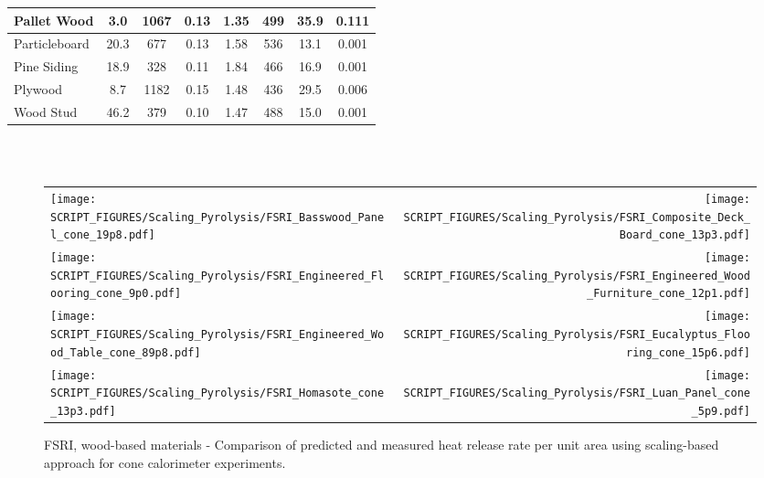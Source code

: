 \begin{table}[!h]
\begin{tabular}{|p{4.5cm}|c|c|c|c|c|c|c|}
Pallet Wood                                       & 3.0  & 1067 & 0.13 & 1.35 & 499 & 35.9 & 0.111 \\\hline
Particleboard                                     & 20.3 & 677  & 0.13 & 1.58 & 536 & 13.1 & 0.001 \\\hline
Pine Siding                                       & 18.9 & 328  & 0.11 & 1.84 & 466 & 16.9 & 0.001 \\\hline
Plywood                                           & 8.7  & 1182 & 0.15 & 1.48 & 436 & 29.5 & 0.006 \\\hline
Wood Stud                                         & 46.2 & 379  & 0.10 & 1.47 & 488 & 15.0 & 0.001 \\\hline
\end{tabular}
\label{Properties_FSRI_Materials_Wood-Based}
\end{table}
\vspace{-0.4cm}
\\
\\


\begin{figure}[p]
\begin{tabular*}{\textwidth}{l@{\extracolsep{\fill}}r}
\texttt{[image: SCRIPT\_FIGURES/Scaling\_Pyrolysis/FSRI\_Basswood\_Panel\_cone\_19p8.pdf]} &
\texttt{[image: SCRIPT\_FIGURES/Scaling\_Pyrolysis/FSRI\_Composite\_Deck\_Board\_cone\_13p3.pdf]} \\
\texttt{[image: SCRIPT\_FIGURES/Scaling\_Pyrolysis/FSRI\_Engineered\_Flooring\_cone\_9p0.pdf]} &
\texttt{[image: SCRIPT\_FIGURES/Scaling\_Pyrolysis/FSRI\_Engineered\_Wood\_Furniture\_cone\_12p1.pdf]} \\
\texttt{[image: SCRIPT\_FIGURES/Scaling\_Pyrolysis/FSRI\_Engineered\_Wood\_Table\_cone\_89p8.pdf]} &
\texttt{[image: SCRIPT\_FIGURES/Scaling\_Pyrolysis/FSRI\_Eucalyptus\_Flooring\_cone\_15p6.pdf]} \\
\texttt{[image: SCRIPT\_FIGURES/Scaling\_Pyrolysis/FSRI\_Homasote\_cone\_13p3.pdf]} &
\texttt{[image: SCRIPT\_FIGURES/Scaling\_Pyrolysis/FSRI\_Luan\_Panel\_cone\_5p9.pdf]} \\
\end{tabular*}
\caption[HRRPUA of FSRI Materials using scaling model, wood-based materials]
{FSRI, wood-based materials - Comparison of predicted and measured heat release rate per unit area using scaling-based approach for cone calorimeter experiments.}
\label{FSRI_Materials_HRR_Wood-Based1}
\end{figure}

